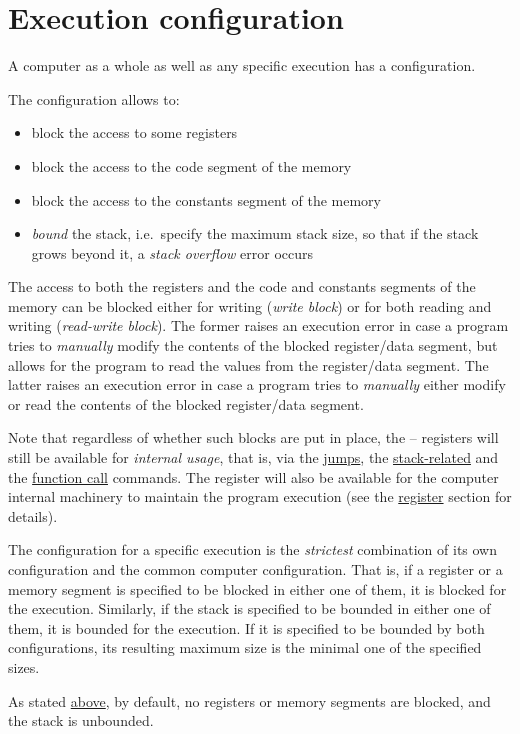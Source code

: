 \hypertarget{config}{
    \section{Execution configuration}
}

A  computer as a whole as well as any specific execution
has a configuration.

The configuration allows to:

\begin{itemize}
    \item block the access to some registers
    \item block the access to the code segment of the memory
    \item block the access to the constants segment of the memory
    \item \textit{bound} the stack, i.e.\ specify the maximum stack size,
    so that if the stack grows beyond it, a \textit{stack overflow} error occurs
\end{itemize}

The access to both the registers and the code and constants segments of
the memory can be blocked either for writing (\textit{write block}) or for both
reading and writing (\textit{read-write block}).
The former raises an execution error in case a program tries to
\textit{manually} modify the contents of the blocked register/data segment,
but allows for the program to read the values from the register/data segment.
The latter raises an execution error in case a program tries to
\textit{manually} either modify or read the contents of the blocked
register/data segment.

Note that regardless of whether such blocks are put in place,
the -- registers will still be available for
\textit{internal usage}, that is, via the \hyperlink{cmd:flags}{jumps},
the \hyperlink{cmd:stack}{stack-related} and
the \hyperlink{functions:commands}{function call} commands.
The  register will also be available for the  computer
internal machinery to maintain the program execution
(see the \hyperlink{r15}{ register} section for details).

The configuration for a specific execution is the \textit{strictest} combination
of its own configuration and the common  computer configuration.
That is, if a register or a memory segment is specified to be blocked in either
one of them, it is blocked for the execution.
Similarly, if the stack is specified to be bounded in either one of them,
it is bounded for the execution.
If it is specified to be bounded by both configurations,
its resulting maximum size is the minimal one of the specified sizes.

As stated \hyperlink{standard:notes}{above}, by default, no registers or
memory segments are blocked, and the stack is unbounded.
